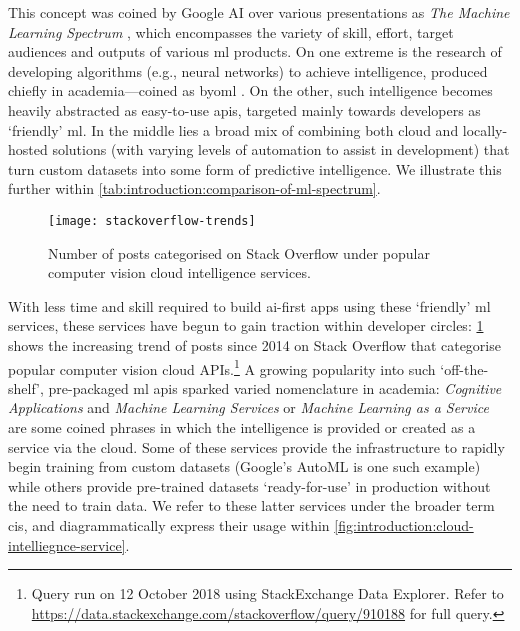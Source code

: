 This concept was coined by Google AI over various presentations as \textit{The Machine Learning Spectrum} \citep{Ortiz:2017wg,LaForge:2018tm,McGowen:2019vt}, which encompasses the variety of skill, effort, target audiences and outputs of various \gls{ml} products. On one extreme is the research of developing algorithms (e.g., neural networks) to achieve intelligence, produced chiefly in academia---coined as \gls{byoml} \citep{Ortiz:2017wg,McGowen:2019vt,Jimerson:2017vh}. On the other, such intelligence becomes heavily abstracted as easy-to-use \glspl{api}, targeted mainly towards developers as `friendly' \gls{ml}. In the middle lies a broad mix of combining both cloud and locally-hosted solutions (with varying levels of automation to assist in development) that turn custom datasets into some form of predictive intelligence. We illustrate this further within \cref{tab:introduction:comparison-of-ml-spectrum}.



\begin{figure}[h!]
\centering
\caption[Increasing interest in the developer community of computer vision APIs]{Number of posts categorised on Stack Overflow under popular computer vision cloud intelligence services.}
\label{fig:introduction:stackoverflow-trends}
\texttt{[image: stackoverflow-trends]}
\end{figure}

With less time and skill required to build \gls{ai}-first apps using these `friendly' \gls{ml} services,  these services have begun to gain traction within developer circles: \cref{fig:introduction:stackoverflow-trends} shows the increasing trend of posts since 2014 on Stack Overflow that categorise popular computer vision cloud APIs.\footnote{Query run on 12 October 2018 using StackExchange Data Explorer. Refer to \url{https://data.stackexchange.com/stackoverflow/query/910188} for full query.} A growing popularity into such `off-the-shelf', pre-packaged \gls{ml} \glspl{api} sparked varied nomenclature in academia: \textit{Cognitive Applications} and \textit{Machine Learning Services} \citep{Hwang:2017tr} or \textit{Machine Learning as a Service} \citep{Ribeiro:2015dz} are some coined phrases in which the intelligence is provided or created as a service via the cloud. Some of these services provide the infrastructure to rapidly begin training from custom datasets (Google's AutoML is one such example) while others provide pre-trained datasets `ready-for-use' in production without the need to train data. We refer to these latter services under the broader term \gls{cis}, and diagrammatically express their usage within \cref{fig:introduction:cloud-intelliegnce-service}.


